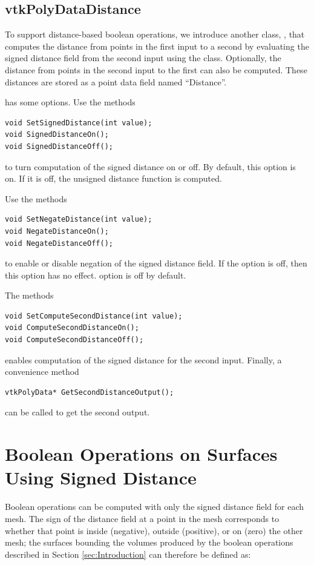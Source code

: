 \documentclass{InsightArticle}
\begin{document}
\subsection{vtkPolyDataDistance}

To support distance-based boolean operations, we introduce another class, , that computes the distance from points in the first input  to a second by evaluating the signed distance field from the second input using the  class. Optionally, the distance from points in the second input  to the first can also be computed. These distances are stored as a point data field named ``Distance''.

 has some options. Use the methods
\begin{verbatim}
void SetSignedDistance(int value);
void SignedDistanceOn();
void SignedDistanceOff();
\end{verbatim}
to turn computation of the signed distance on or off. By default, this option is on. If it is off, the unsigned distance function is computed.

Use the methods
\begin{verbatim}
void SetNegateDistance(int value);
void NegateDistanceOn();
void NegateDistanceOff();
\end{verbatim}
to enable or disable negation of the signed distance field. If the  option is off, then this option has no effect.  option is off by default.

The methods
\begin{verbatim}
void SetComputeSecondDistance(int value);
void ComputeSecondDistanceOn();
void ComputeSecondDistanceOff();
\end{verbatim}
enables computation of the signed distance for the second input. Finally, a convenience method
\begin{verbatim}
vtkPolyData* GetSecondDistanceOutput();
\end{verbatim}
can be called to get the second output.

\section{Boolean Operations on Surfaces Using Signed Distance}

Boolean operations can be computed with only the signed distance field for each mesh. The sign of the distance field at a point in the mesh corresponds to whether that point is inside (negative), outside (positive), or on (zero) the other mesh; the surfaces bounding the volumes produced by the boolean operations described in Section \ref{sec:Introduction} can therefore be defined as:
\end{document}
